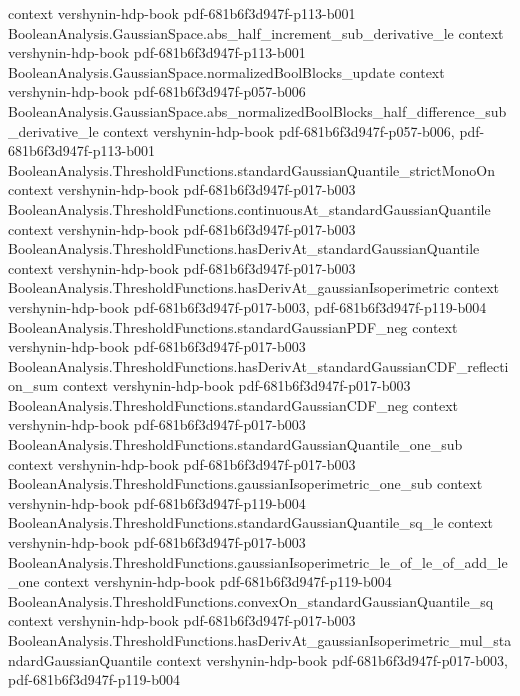 \begin{theorem}
  {context}
  {vershynin-hdp-book}
  {pdf-681b6f3d947f-p113-b001}
\proofstep
  {BooleanAnalysis.GaussianSpace.abs_half_increment_sub_derivative_le}
  {context}
  {vershynin-hdp-book}
  {pdf-681b6f3d947f-p113-b001}
\proofstep
  {BooleanAnalysis.GaussianSpace.normalizedBoolBlocks_update}
  {context}
  {vershynin-hdp-book}
  {pdf-681b6f3d947f-p057-b006}
\proofstep
  {BooleanAnalysis.GaussianSpace.abs_normalizedBoolBlocks_half_difference_sub_derivative_le}
  {context}
  {vershynin-hdp-book}
  {pdf-681b6f3d947f-p057-b006,
    pdf-681b6f3d947f-p113-b001}
\proofstep
  {BooleanAnalysis.ThresholdFunctions.standardGaussianQuantile_strictMonoOn}
  {context}
  {vershynin-hdp-book}
  {pdf-681b6f3d947f-p017-b003}
\proofstep
  {BooleanAnalysis.ThresholdFunctions.continuousAt_standardGaussianQuantile}
  {context}
  {vershynin-hdp-book}
  {pdf-681b6f3d947f-p017-b003}
\proofstep
  {BooleanAnalysis.ThresholdFunctions.hasDerivAt_standardGaussianQuantile}
  {context}
  {vershynin-hdp-book}
  {pdf-681b6f3d947f-p017-b003}
\proofstep
  {BooleanAnalysis.ThresholdFunctions.hasDerivAt_gaussianIsoperimetric}
  {context}
  {vershynin-hdp-book}
  {pdf-681b6f3d947f-p017-b003,
    pdf-681b6f3d947f-p119-b004}
\proofstep
  {BooleanAnalysis.ThresholdFunctions.standardGaussianPDF_neg}
  {context}
  {vershynin-hdp-book}
  {pdf-681b6f3d947f-p017-b003}
\proofstep
  {BooleanAnalysis.ThresholdFunctions.hasDerivAt_standardGaussianCDF_reflection_sum}
  {context}
  {vershynin-hdp-book}
  {pdf-681b6f3d947f-p017-b003}
\proofstep
  {BooleanAnalysis.ThresholdFunctions.standardGaussianCDF_neg}
  {context}
  {vershynin-hdp-book}
  {pdf-681b6f3d947f-p017-b003}
\proofstep
  {BooleanAnalysis.ThresholdFunctions.standardGaussianQuantile_one_sub}
  {context}
  {vershynin-hdp-book}
  {pdf-681b6f3d947f-p017-b003}
\proofstep
  {BooleanAnalysis.ThresholdFunctions.gaussianIsoperimetric_one_sub}
  {context}
  {vershynin-hdp-book}
  {pdf-681b6f3d947f-p119-b004}
\proofstep
  {BooleanAnalysis.ThresholdFunctions.standardGaussianQuantile_sq_le}
  {context}
  {vershynin-hdp-book}
  {pdf-681b6f3d947f-p017-b003}
\proofstep
  {BooleanAnalysis.ThresholdFunctions.gaussianIsoperimetric_le_of_le_of_add_le_one}
  {context}
  {vershynin-hdp-book}
  {pdf-681b6f3d947f-p119-b004}
\proofstep
  {BooleanAnalysis.ThresholdFunctions.convexOn_standardGaussianQuantile_sq}
  {context}
  {vershynin-hdp-book}
  {pdf-681b6f3d947f-p017-b003}
\proofstep
  {BooleanAnalysis.ThresholdFunctions.hasDerivAt_gaussianIsoperimetric_mul_standardGaussianQuantile}
  {context}
  {vershynin-hdp-book}
  {pdf-681b6f3d947f-p017-b003,
    pdf-681b6f3d947f-p119-b004}

\end{theorem}
